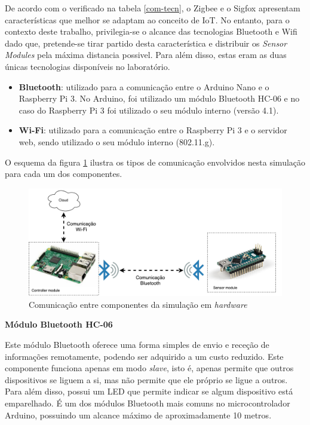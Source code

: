 De acordo com o verificado na tabela \ref{com-tecn}, o Zigbee e o Sigfox apresentam características que melhor se adaptam ao conceito de \ac{IoT}. No entanto, para o contexto deste trabalho, privilegia-se o alcance das tecnologias Bluetooth e Wifi dado que, pretende-se tirar partido desta característica e distribuir os  \textit{Sensor Modules} pela máxima distancia possivel. Para além disso, estas eram as duas únicas tecnologias disponíveis no laboratório.

\begin{itemize}
	\item \textbf{Bluetooth}: utilizado para a comunicação entre o Arduino Nano e o Raspberry Pi 3. No Arduino, foi utilizado um módulo Bluetooth HC-06 e no caso do Raspberry Pi 3 foi utilizado o seu módulo interno (versão 4.1). 
	\item \textbf{Wi-Fi}: utilizado para a comunicação entre o Raspberry Pi 3 e o servidor web, sendo utilizado o seu módulo interno (802.11.g). 
\end{itemize}


O esquema da figura \ref{esquemcomm} ilustra os tipos de comunicação envolvidos nesta simulação para cada um dos componentes. 

\begin{figure}[!htb]
	\centering
	\includegraphics[width=\linewidth]{img/comm-blue/HW-geral.pdf}
	\caption{Comunicação entre componentes da simulação em \textit{hardware}}
	\label{esquemcomm}
\end{figure}




\textbf{Módulo Bluetooth HC-06}



Este módulo Bluetooth oferece uma forma simples de envio e receção de informações remotamente, podendo ser adquirido a um custo reduzido. Este componente funciona apenas em modo \textit{slave}, isto é, apenas permite que outros dispositivos se liguem a si, mas não permite que ele próprio se ligue a outros. Para além disso, possui um \ac{LED} que permite indicar se algum dispositivo está emparelhado. É um dos módulos Bluetooth mais comuns no microcontrolador Arduino, possuindo um alcance máximo de aproximadamente 10 metros\cite{GuangzhouHCInformationTechnologyCo.2011}.


